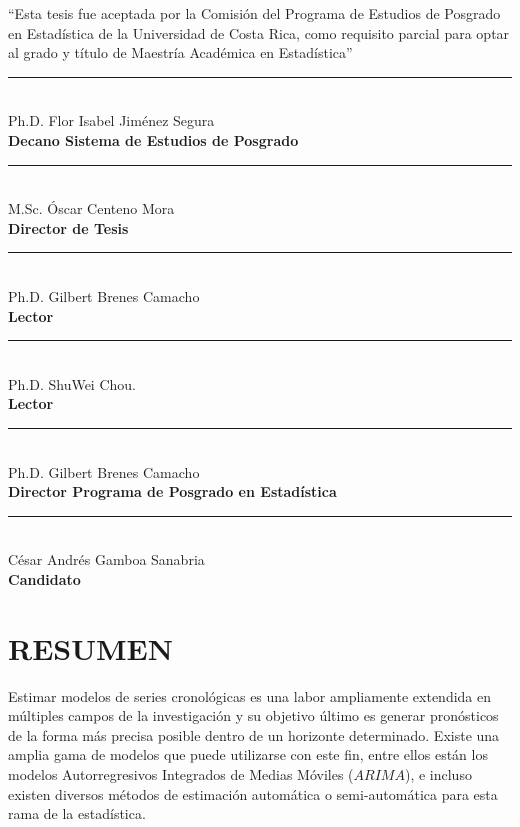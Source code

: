 \documentclass[
]{article}
\begin{document}
\begin{center}

``Esta tesis fue aceptada por la Comisión del Programa de Estudios de Posgrado en Estadística de la Universidad de Costa Rica, como requisito parcial para optar al grado y título de Maestría Académica en Estadística''

\text{}

\noindent\rule{7cm}{0.4pt}\\
Ph.D. Flor Isabel Jiménez Segura\\
\textbf{Decano Sistema de Estudios de Posgrado}

\text{}

\noindent\rule{7cm}{0.4pt}\\
M.Sc. Óscar Centeno Mora\\
\textbf{Director de Tesis}

\text{}

\noindent\rule{7cm}{0.4pt}\\
Ph.D. Gilbert Brenes Camacho\\
\textbf{Lector}

\text{}

\noindent\rule{7cm}{0.4pt}\\
Ph.D. ShuWei Chou.\\
\textbf{Lector}

\text{}

\noindent\rule{7cm}{0.4pt}\\
Ph.D. Gilbert Brenes Camacho\\
\textbf{Director Programa de Posgrado en Estadística}

\text{}

\noindent\rule{7cm}{0.4pt}\\
César Andrés Gamboa Sanabria\\
\textbf{Candidato}

\end{center}

\cleardoublepage

\tableofcontents

\cleardoublepage

\section*{RESUMEN}

Estimar modelos de series cronológicas es una labor ampliamente
extendida en múltiples campos de la investigación y su objetivo último
es generar pronósticos de la forma más precisa posible dentro de un
horizonte determinado. Existe una amplia gama de modelos que puede
utilizarse con este fin, entre ellos están los modelos Autorregresivos
Integrados de Medias Móviles (\(ARIMA\)), e incluso existen diversos
métodos de estimación automática o semi-automática para esta rama de la
estadística.
\end{document}
